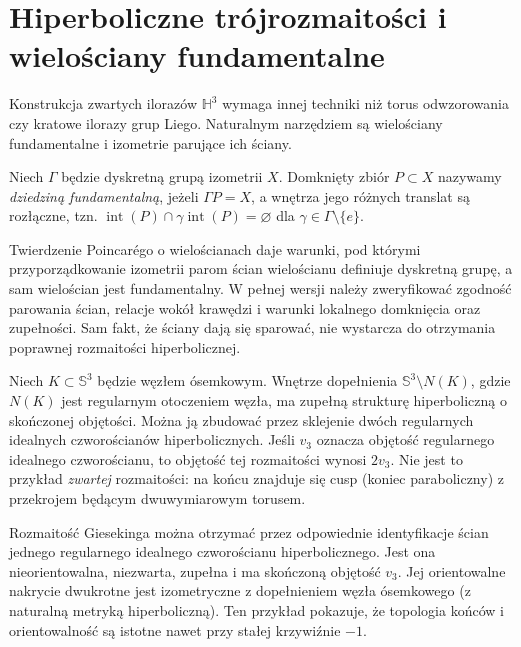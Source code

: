 \section{Hiperboliczne trójrozmaitości i wielościany fundamentalne}
\label{sec:thurston-hyperbolic}

Konstrukcja zwartych ilorazów $\mathbb H^3$ wymaga innej techniki
niż torus odwzorowania czy kratowe ilorazy grup Liego.
Naturalnym narzędziem są wielościany fundamentalne i izometrie
parujące ich ściany.

\begin{definicja}
Niech $\Gamma$ będzie dyskretną grupą izometrii $X$.
Domknięty zbiór $P\subset X$ nazywamy \emph{dziedziną
fundamentalną}, jeżeli $\Gamma P=X$, a wnętrza jego różnych
translat są rozłączne, tzn.
$\operatorname{int}(P)\cap\gamma\operatorname{int}(P)=\varnothing$
dla $\gamma\in\Gamma\setminus\{e\}$.
\end{definicja}

Twierdzenie Poincarégo o wielościanach daje warunki, pod którymi
przyporządkowanie izometrii parom ścian wielościanu definiuje
dyskretną grupę, a sam wielościan jest fundamentalny. W pełnej
wersji należy zweryfikować zgodność parowania ścian,
relacje wokół krawędzi i warunki lokalnego domknięcia oraz
zupełności. Sam fakt, że ściany dają się sparować, nie
wystarcza do otrzymania poprawnej rozmaitości hiperbolicznej.

\begin{przyklad}
Niech $K\subset\mathbb S^3$ będzie węzłem ósemkowym.
Wnętrze dopełnienia $\mathbb S^3\setminus N(K)$, gdzie $N(K)$
jest regularnym otoczeniem węzła, ma zupełną strukturę
hiperboliczną o skończonej objętości. Można ją zbudować przez
sklejenie dwóch regularnych idealnych czworościanów
hiperbolicznych. Jeśli $v_3$ oznacza objętość regularnego
idealnego czworościanu, to objętość tej rozmaitości wynosi
$2v_3$. Nie jest to przykład \emph{zwartej} rozmaitości:
na końcu znajduje się cusp (koniec paraboliczny) z
przekrojem będącym dwuwymiarowym torusem.
\end{przyklad}

\begin{przyklad}
Rozmaitość Giesekinga można otrzymać przez odpowiednie
identyfikacje ścian jednego regularnego idealnego
czworościanu hiperbolicznego. Jest ona nieorientowalna,
niezwarta, zupełna i ma skończoną objętość $v_3$.
Jej orientowalne nakrycie dwukrotne jest izometryczne z
dopełnieniem węzła ósemkowego (z naturalną metryką
hiperboliczną). Ten przykład pokazuje, że topologia końców
i orientowalność są istotne nawet przy stałej krzywiźnie $-1$.
\end{przyklad}


